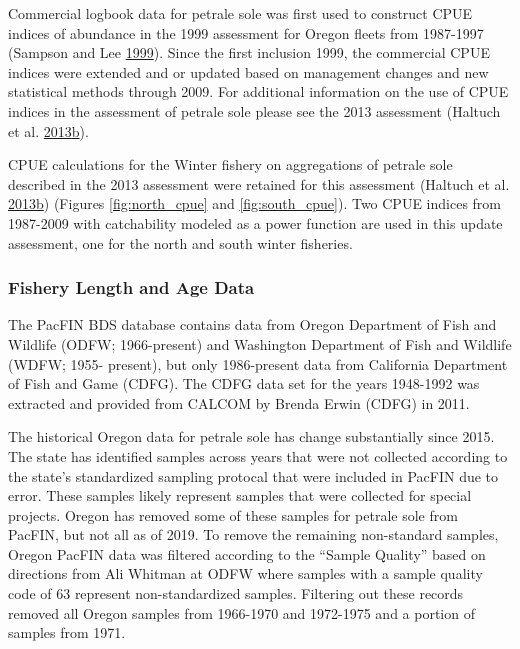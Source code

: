 \documentclass[12pt,]{article}
\begin{document}
Commercial logbook data for petrale sole was first used to construct
CPUE indices of abundance in the 1999 assessment for Oregon fleets from
1987-1997 (Sampson and Lee
\protect\hyperlink{ref-sampson_assessment_1999}{1999}). Since the first
inclusion 1999, the commercial CPUE indices were extended and or updated
based on management changes and new statistical methods through 2009.
For additional information on the use of CPUE indices in the assessment
of petrale sole please see the 2013 assessment (Haltuch et al.
\protect\hyperlink{ref-haltuch_status_2013}{2013}\protect\hyperlink{ref-haltuch_status_2013}{b}).

CPUE calculations for the Winter fishery on aggregations of petrale sole
described in the 2013 assessment were retained for this assessment
(Haltuch et al.
\protect\hyperlink{ref-haltuch_status_2013}{2013}\protect\hyperlink{ref-haltuch_status_2013}{b})
(Figures \ref{fig:north_cpue} and \ref{fig:south_cpue}). Two CPUE
indices from 1987-2009 with catchability modeled as a power function are
used in this update assessment, one for the north and south winter
fisheries.

\subsubsection{Fishery Length and Age
Data}\label{fishery-length-and-age-data}

The PacFIN BDS database contains data from Oregon Department of Fish and
Wildlife (ODFW; 1966-present) and Washington Department of Fish and
Wildlife (WDFW; 1955- present), but only 1986-present data from
California Department of Fish and Game (CDFG). The CDFG data set for the
years 1948-1992 was extracted and provided from CALCOM by Brenda Erwin
(CDFG) in 2011.

The historical Oregon data for petrale sole has change substantially
since 2015. The state has identified samples across years that were not
collected according to the state's standardized sampling protocal that
were included in PacFIN due to error. These samples likely represent
samples that were collected for special projects. Oregon has removed
some of these samples for petrale sole from PacFIN, but not all as of
2019. To remove the remaining non-standard samples, Oregon PacFIN data
was filtered according to the ``Sample Quality'' based on directions
from Ali Whitman at ODFW where samples with a sample quality code of 63
represent non-standardized samples. Filtering out these records removed
all Oregon samples from 1966-1970 and 1972-1975 and a portion of samples
from 1971.
\end{document}
